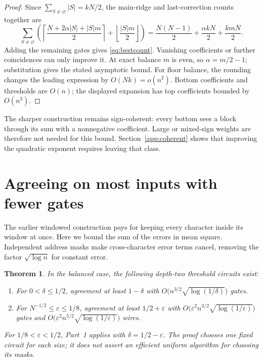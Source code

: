 \documentclass[11pt,letterpaper]{article}
\newtheorem{theorem}{Theorem}
\theoremstyle{remark}
\newcommand{\sect}[1]{\section{\texorpdfstring{\color{ink}#1}{#1}}}
\begin{document}
\begin{proof}
Since $\sum_{S\ne\varnothing}|S|=kN/2$, the main-ridge and last-correction
counts together are
\[
\sum_{S\ne\varnothing}\left(
 \left\lceil\frac{N+2\alpha|S|+|S|m}{2}\right\rceil
 +\left\lfloor\frac{|S|m}{2}\right\rfloor\right)
 =\frac{N(N-1)}2+\frac{\alpha kN}2+\frac{kmN}2.
\]
Adding the remaining gates gives \eqref{eq:bestcount}. Vanishing coefficients
or further coincidences can only improve it. At exact balance $m$ is even,
so $\alpha=m/2-1$; substitution gives the stated asymptotic bound.
For floor balance, the rounding changes the leading expression by
$O(Nk)=o(n^2)$. Bottom coefficients and thresholds are $O(n)$; the displayed
expansion has top coefficients bounded by $O(n^3)$.
\end{proof}

The sharper construction remains sign-coherent: every bottom sees a block
through its sum with a nonnegative coefficient. Large or mixed-sign weights
are therefore not needed for this bound. Section~\ref{app:coherent} shows
that improving the quadratic exponent requires leaving that class.


\sect{Agreeing on most inputs with fewer gates}\label{sec:avgupper}

The earlier windowed construction pays for keeping every character inside
its window at once. Here we bound the sum of the errors in mean square.
Independent address masks make cross-character error terms cancel, removing
the factor $\sqrt{\log n}$ for constant error.

\begin{theorem}\label{thm:avgupper}
In the balanced case, the following depth-two threshold circuits exist:
\begin{enumerate}
\item For $0<\delta\le1/2$, agreement at least $1-\delta$ with
      $O\bigl(n^{3/2}\sqrt{\log(1/\delta)}\bigr)$ gates.
\item For $N^{-1/2}\le\varepsilon\le1/8$, agreement at least
      $1/2+\varepsilon$ with
      $O\bigl(\varepsilon^2n^{3/2}\sqrt{\log(1/\varepsilon)}\bigr)$ gates
      and $O\bigl(\varepsilon^2n^{5/2}\sqrt{\log(1/\varepsilon)}\bigr)$ wires.
\end{enumerate}
For $1/8<\varepsilon<1/2$, Part~1 applies with $\delta=1/2-\varepsilon$.
The proof chooses one fixed circuit for each size; it does not assert an
efficient uniform algorithm for choosing its masks.
\end{theorem}
\end{document}
